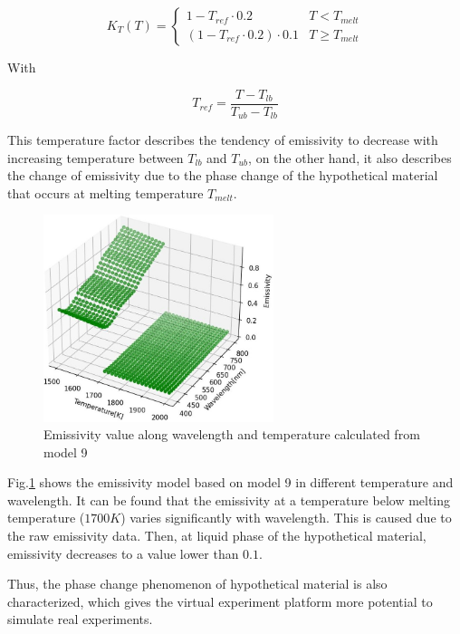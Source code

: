 \begin{equation}
  \label{eq: k_t}
  K_T(T)=\begin{cases}
    1 - T_{ref} \cdot 0.2 &   T<T_{melt}\\
    \left(1 - T_{ref} \cdot 0.2 \right) \cdot 0.1 &  T\geq T_{melt}
  \end{cases}
\end{equation}


With 

\begin{equation}
  \label{eq: t_ref}
  T_{ref}=\frac{T - T_{lb}}{T_{ub} - T_{lb}}
\end{equation}


This temperature factor describes the tendency 
of emissivity to decrease with increasing temperature between $T_{lb}$ and $T_{ub}$, 
on the other hand, it also describes the change of emissivity due to the 
phase change of the hypothetical material that occurs at melting 
temperature $T_{melt}$.

\begin{figure}[htbp]
  \centering
  \includegraphics[width=0.6\textwidth]{figures/emissivity_model.jpg}
  \caption{Emissivity value along wavelength and temperature calculated from model 9}
  \label{fig: emissivity_model}
\end{figure}


Fig.\ref{fig: emissivity_model} shows the emissivity model based 
on model 9 in different temperature 
and wavelength. It can be found that the emissivity at a temperature 
below melting temperature ($1700K$) varies significantly with wavelength.
This is caused due to the raw emissivity data. Then, at liquid phase of 
the hypothetical material, emissivity decreases to a value lower than $0.1$.


Thus, the phase change phenomenon of hypothetical material is also characterized, 
which gives the virtual experiment platform more potential to simulate 
real experiments.


